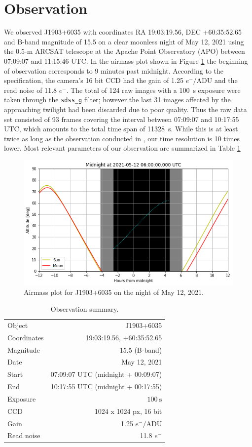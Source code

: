 \documentclass{aastex631}
\begin{document}
\section{Observation}
We observed J1903+6035 with coordinates RA 19:03:19.56, DEC
+60:35:52.65 and B-band magnitude of 15.5 on a clear moonless night of
May 12, 2021 using the 0.5-m ARCSAT telescope at the Apache Point
Observatory (APO) between 07:09:07 and 11:15:46 UTC. In the airmass
plot shown in Figure \ref{fig:am} the beginning of observation
corresponds to 9 minutes past midnight. According to the
specification, the camera's 16 bit CCD had the gain of 1.25
$e^-/\mathrm{ADU}$ and the read noise of 11.8 $e^-$. The total of 124
raw images with a \SI{100}{\second} exposure were taken through the
\texttt{sdss\_g} filter; however the last 31 images affected by the
approaching twilight had been discarded due to poor quality. Thus the
raw data set consisted of 93 frames covering the interval between
07:09:07 and 10:17:55 UTC, which amounts to the total time span of
\SI{11328}{\second}. While this is at least twice as long as the
observation conducted in \citet{Vincent_2020}, our time resolution is
10 times lower. Most relevant parameters of our observation are
summarized in Table \ref{tab:obs}
\begin{figure}[htbp]
\centering
\includegraphics[width=.9\linewidth]{./img/airmass.png}
\caption{\label{fig:am} Airmass plot for J1903+6035 on the night of
  May 12, 2021.}
\end{figure}

\begin{table}
  \centering
  \caption{\label{tab:obs}Observation summary.}
  \begin{tabular}{lr}
    \hline
    Object & J1903+6035 \\
    Coordinates & 19:03:19.56, +60:35:52.65 \\
    Magnitude & 15.5 (B-band) \\
    Date & May 12, 2021 \\
    Start & 07:09:07 UTC (midnight + 00:09:07) \\
    End & 10:17:55 UTC (midnight + 00:17:55) \\
    Exposure & $\SI{100}{\second}$ \\
    CCD & 1024 x 1024 px, 16 bit \\
    Gain & 1.25 $e^-/\mathrm{ADU}$ \\
    Read noise & 11.8 $e^-$ \\
    \hline
  \end{tabular}
\end{table}
\end{document}
